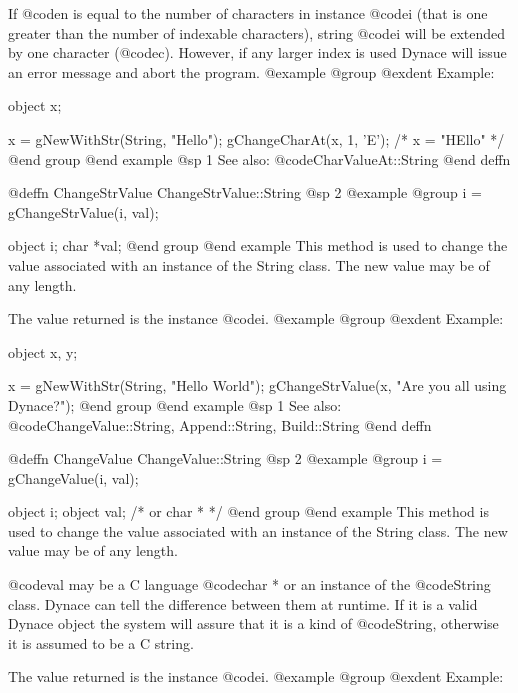 If @code{n} is equal to the number of characters in instance @code{i}
(that is one greater than the number of indexable characters), string
@code{i} will be extended by one character (@code{c}).  However, if any
larger index is used Dynace will issue an error message and abort the
program.
@example
@group
@exdent Example:

object  x;

x = gNewWithStr(String, "Hello");
gChangeCharAt(x, 1, 'E');
/*  x = "HEllo"  */
@end group
@end example
@sp 1
See also:  @code{CharValueAt::String}
@end deffn










@deffn {ChangeStrValue} ChangeStrValue::String
@sp 2
@example
@group
i = gChangeStrValue(i, val);

object  i;
char   *val;
@end group
@end example
This method is used to change the value associated with an instance of
the String class.  The new value may be of any length.

The value returned is the instance @code{i}.
@example
@group
@exdent Example:

object  x, y;

x = gNewWithStr(String, "Hello World");
gChangeStrValue(x, "Are you all using Dynace?");
@end group
@end example
@sp 1
See also:  @code{ChangeValue::String, Append::String, Build::String}
@end deffn














@deffn {ChangeValue} ChangeValue::String
@sp 2
@example
@group
i = gChangeValue(i, val);

object  i;
object  val;  /*  or char *  */
@end group
@end example
This method is used to change the value associated with an instance of
the String class.  The new value may be of any length.

@code{val} may be a C language @code{char *} or an instance of the
@code{String} class.  Dynace can tell the difference between them at
runtime.  If it is a valid Dynace object the system will assure that it is
a kind of @code{String}, otherwise it is assumed to be a C string.

The value returned is the instance @code{i}.
@example
@group
@exdent Example:

